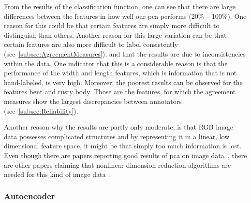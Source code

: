 \bigskip
From the results of the classification function, one can see that there are large differences between the features in how well our \acrshort{pca} performs (20\% -- 100\%).
One reason for this could be that certain features are simply more difficult to distinguish than others. Another reason for this large variation can be that certain features are also more difficult to label consistently (see~\autoref{subsec:AgreementMeasures}), and that the results are due to inconsistencies within the data. One indicator that this is a considerable reason is that the performance of the width and length features, which is information that is not hand-labeled, is very high. Moreover, the poorest results can be observed for the features bent and rusty body. Those are the features, for which the agreement measures show the largest discrepancies between annotators (see~\autoref{subsec:Reliability}).  

\bigskip
Another reason why the results are partly only moderate, is that RGB image data possesses complicated structures and by representing it in a linear, low dimensional feature space, it might be that simply too much information is lost. Even though there are papers reporting good results of \acrshort{pca} on image data~\citep{turk1991face,lata2009}, there are other papers claiming that nonlinear dimension reduction algorithms are needed for this kind of image data~\citep{olaode2014}.


\subsubsection{Autoencoder}
\label{subsec:Autoencoder}

